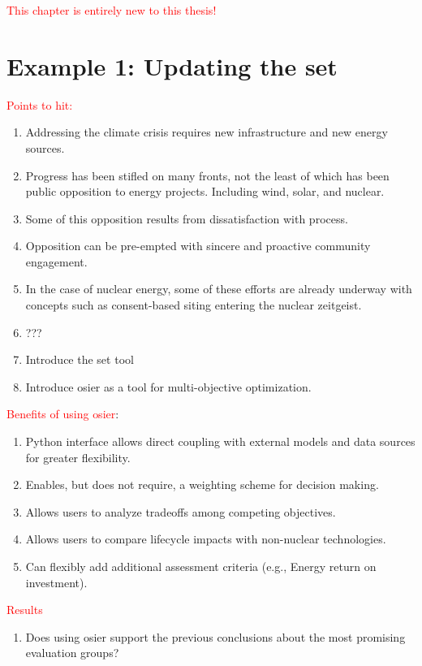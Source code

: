 
\textcolor{red}{This chapter is entirely new to this thesis!}

\section{Example 1: Updating the \ac{set}}

\textcolor{red}{Points to hit:}
\begin{enumerate}
    \item Addressing the climate crisis requires new infrastructure and new energy sources.
    \item Progress has been stifled on many fronts, not the least of which has been public opposition to energy projects. Including wind, solar, and nuclear.
    \item Some of this opposition results from dissatisfaction with process.
    \item Opposition can be pre-empted with sincere and proactive community engagement.
    \item In the case of nuclear energy, some of these efforts are already underway with concepts such as consent-based siting entering the nuclear zeitgeist.
    \item ???
    \item Introduce the \ac{set} tool
    \item  Introduce \ac{osier} as a tool for multi-objective optimization.
\end{enumerate}

\textcolor{red}{Benefits of using \ac{osier}}:
\begin{enumerate}
    \item Python interface allows direct coupling with external models and data sources for greater flexibility.
    \item Enables, but does not require, a weighting scheme for decision making.
    \item Allows users to analyze tradeoffs among competing objectives.
    \item Allows users to compare lifecycle impacts with non-nuclear technologies.
    \item Can flexibly add additional assessment criteria (e.g., Energy return on investment). 
\end{enumerate}

\textcolor{red}{Results}
\begin{enumerate}
    \item Does using \ac{osier} support the previous conclusions about the most promising evaluation groups?
\end{enumerate}

